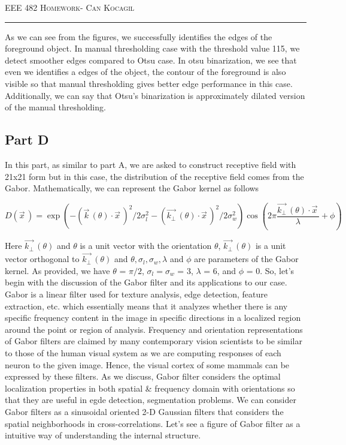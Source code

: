 \documentclass[12pt]{amsart}
\begin{document}
\newpage
{\scshape EEE 482} \hfill {\scshape \large  Homework-\relax} \hfill {\scshape Can Kocagil}
\smallskip
\hrule
\vspace{2mm}

As we can see from the figures, we successfully identifies the edges of the foreground object. In manual thresholding case with the threshold value 115, we detect smoother edges compared to Otsu case. In otsu binarization, we see that even we identifies a edges of the object, the contour of the foreground is also visible so that manual thresholding gives better edge performance in this case. Additionally, we can say that Otsu's binarization is approximately dilated version of the manual thresholding.

\subsection{Part D}

In this part, as similar to part A, we are asked to construct receptive field with 21x21 form but in this case, the distribution of the receptive field comes from the Gabor. Mathematically, we can represent the Gabor kernel as follows


\begin{equation}
    D(\vec{x}^{\,}) = \exp{\left(- (\vec{k}^{\,}(\theta) \cdot \vec{x}^{\,})^2 / 2\sigma_l^2 - (\vec{k_\bot}^{\,}(\theta) \cdot \vec{x}^{\,})^2 / 2\sigma_w^2 \right)} \cos{\left(2\pi \frac{\vec{k_\bot}^{\,}(\theta) \cdot \vec{x}^{\,}}{\lambda} + \phi \right)}
\end{equation}

Here $\vec{k_\bot}^{\,}(\theta)$ and $\theta$ is a unit vector with the orientation $\theta$,  $\vec{k_\bot}^{\,}(\theta)$ is a unit vector orthogonal to $\vec{k_\bot}^{\,}(\theta)$ and $\theta, \sigma_l,\sigma_w,\lambda$ and $\phi$ are parameters of the Gabor kernel. As provided, we have $\theta$ = $\pi/2$, $\sigma_l = \sigma_w$ = 3, $\lambda$ = 6, and $\phi$ = 0. So, let's begin with the discussion of the Gabor filter and its applications to our case. Gabor is a linear filter used for texture analysis, edge detection, feature extraction, etc. which essentially means that it analyzes whether there is any specific frequency content in the image in specific directions in a localized region around the point or region of analysis\cite{enwiki:993157632}. Frequency and orientation representations of Gabor filters are claimed by many contemporary vision scientists to be similar to those of the human visual system \cite{enwiki:993157632} as we are computing responses of each neuron to the given image. Hence, the visual cortex of some mammals can be expressed by these filters. As we discuss, Gabor filter considers the optimal localization properties in both spatial \& frequency domain with orientations so that they are useful in egde detection, segmentation problems. We can consider Gabor filters as a sinusoidal oriented 2-D Gaussian filters that considers the spatial neighborhoods in cross-correlations. Let's see a figure of Gabor filter as a intuitive way of understanding the internal structure.
\end{document}

